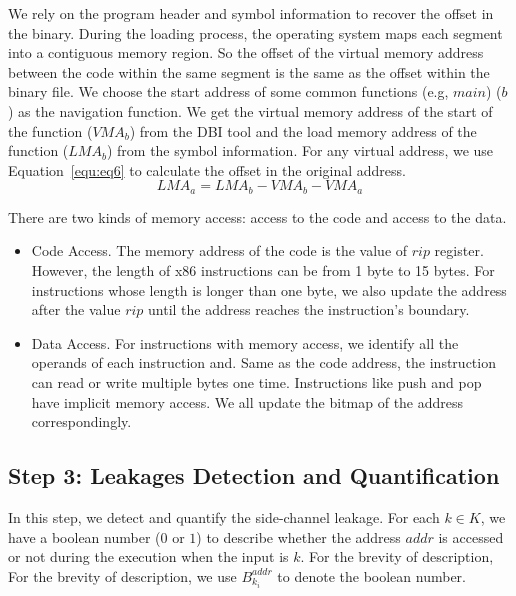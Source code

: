 We rely on the program header and symbol information to recover the
offset in the binary. During the loading process, the operating system
maps each segment into a contiguous memory region. So the offset of
the virtual memory address between the code within the same segment is
the same as the offset within the binary file. We choose the start
address of some common functions (e.g, $\mathit{main}$) ($b$) as the navigation
function. We get the virtual memory address of the start of the
function ($\mathit{VMA}_b$) from the DBI tool and the load memory
address of the function ($\mathit{LMA}_b$) from the symbol
information. For any virtual address, we use Equation~\ref{equ:eq6} to
calculate the offset in the original address.
\begin{equation}\label{equ:eq6}
    \mathit{LMA}_a = \mathit{LMA}_b - \mathit{VMA}_b - \mathit{VMA}_a
\end{equation}

There are two kinds of memory access: access to the code and access to the data. 
\begin{itemize}
\item Code Access. The memory address of the code is the value of $\mathit{rip}$ register. However, the length of x86 instructions can be from 1 byte to 15 bytes. For instructions whose length is longer than one byte, we also update the address after the value $\mathit{rip}$ until the address reaches the instruction's boundary.
\item Data Access. For instructions with memory access, we identify all the operands of each instruction and. Same as the code address, the instruction can read or write multiple bytes one time.  Instructions like \textsf{push} and \textsf{pop} have implicit memory access. We all update the bitmap of the address correspondingly.
\end{itemize}

\subsection{Step 3: Leakages Detection and Quantification}
In this step, we detect and quantify the side-channel leakage. For each $k \in K$, we have a boolean number ($0$ or $1$) to describe whether the address $addr$ is accessed or not during the execution when the input is $k$. For the brevity of description, For the brevity of description, we use $B^{addr}_{k_i}$ to denote the boolean number. 



